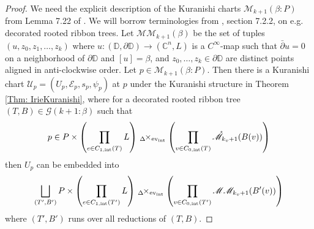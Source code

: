 \documentclass[10pt]{amsart}
\numberwithin{equation}{section}
\theoremstyle{plain}
\theoremstyle{definition}
\theoremstyle{remark}
\numberwithin{equation}{section}
\newcommand{\C}{\mathbb{C}}
\newcommand{\ev}{\textup{ev}}
\newcommand{\ms}[1]{\mathscr{#1}}
\newcommand{\fiberprod}[2]{\,_{#1}\!\!\times_{#2} }
\begin{document}
{\begin{proof}
	
	We need the explicit description of the Kuranishi charts $\ms{M}_{k+1}(\beta:P)$ from Lemma 7.22 of \cite{Irie2}. 
	We will borrow terminologies from \cite{Irie2}, section 7.2.2, on e.g. decorated rooted ribbon trees.
	Let $\ms{M}\ms{M}_{k+1}(\beta)$ be the set of tuples $(u,z_0,z_1,\dots, z_k)$ where $u\colon (\mathbb{D},\partial \mathbb{D})\to (\C^n,L)$ is a $C^\infty$-map such that $\bar\partial u = 0$ on a neighborhood of $\partial \mathbb{D}$ and $[u]=\beta$, and $z_0,\dots, z_k\in \partial \mathbb{D}$ are distinct points aligned in anti-clockwise order. Let $p\in \ms{M}_{k+1}(\beta:P)$. Then there is a Kuranishi chart  $\mathscr{U}_p=(U_p,\mathscr{E}_p,s_p,\psi_p)$ at $p$ under the Kuranishi structure in Theorem \ref{Thm: IrieKuranishi}, where for a decorated rooted ribbon tree $(T,B)\in \mathcal{G}(k+1 : \beta)$  such that 
	\begin{align*}
		p\in P\times \left(\prod_{e\in C_{1,\textup{int}}(T)} L\right) \fiberprod{\Delta}{\ev_{\textup{int}}} \left( \prod_{v\in C_{0,\textup{int}}(T)} \mathring{\ms{M}}_{k_v+1}(B(v))\right)
	\end{align*}
	then $U_p$ can be embedded into 
	\begin{align*}
		\bigsqcup_{(T',B')} P\times \left(\prod_{e\in C_{1,\textup{int}}(T')} L\right) \fiberprod{\Delta}{\ev_{\textup{int}}} \left( \prod_{v\in C_{0,\textup{int}}(T')} \ms{M}\ms{M}_{k_v+1}(B'(v))\right)
	\end{align*}
	where $(T',B')$ runs over all reductions of $(T,B)$. 
	

\end{proof}}
\end{document}

